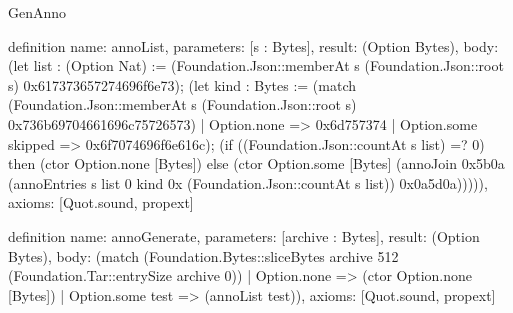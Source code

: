 \begin{lexlean}{GenAnno}
\begin{semanticmodule}
definition{
  name: annoList,
  parameters: [s : Bytes],
  result: (Option Bytes),
  body: (let list : (Option Nat) := (Foundation.Json::memberAt s (Foundation.Json::root s) 0x617373657274696f6e73); (let kind : Bytes := (match (Foundation.Json::memberAt s (Foundation.Json::root s) 0x736b69704661696c75726573)
    | Option.none => 0x6d757374
    | Option.some skipped => 0x6f7074696f6e616c); (if ((Foundation.Json::countAt s list) =? 0) then (ctor Option.none [Bytes]) else (ctor Option.some [Bytes] (annoJoin 0x5b0a (annoEntries s list 0 kind 0x (Foundation.Json::countAt s list)) 0x0a5d0a))))),
  axioms: [Quot.sound, propext]
}

definition{
  name: annoGenerate,
  parameters: [archive : Bytes],
  result: (Option Bytes),
  body: (match (Foundation.Bytes::sliceBytes archive 512 (Foundation.Tar::entrySize archive 0))
    | Option.none => (ctor Option.none [Bytes])
    | Option.some test => (annoList test)),
  axioms: [Quot.sound, propext]
}
\end{semanticmodule}
\end{lexlean}
